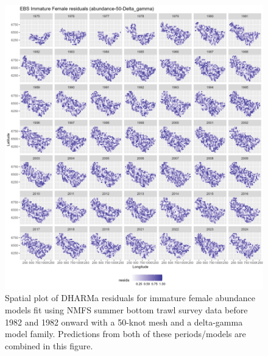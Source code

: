 \documentclass[
]{article}
\begin{document}
\begin{figure}

{\centering \includegraphics[width=1\linewidth,height=1\textheight]{../BAIRDI/Figures/DHARMa_Immature Female_abundance-50-Delta_gamma_SPATIAL} 

}

\caption{Spatial plot of DHARMa residuals for immature female abundance models fit using NMFS summer bottom trawl survey data before 1982 and 1982 onward with a 50-knot mesh and a delta-gamma model family. Predictions from both of these periods/models are combined in this figure.}\label{fig:DHARMa-abund-spat-50-imfem}
\end{figure}
\end{document}
